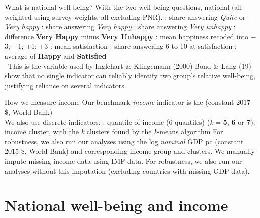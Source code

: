 \documentclass[aspectratio=169,xcolor=dvipsnames, 11pt,mathserif]{beamer}
\begin{document}
\begin{frame}{What is national well-being?}
    With the two well-being questions,  national  (all weighted using survey weights, all excluding PNR).
    \bbvsp
    \ip \textbf{}: share answering \textit{Quite} or \textit{Very happy}
    \ip \textbf{}: share answering \textit{Very happy}
    \ip \textbf{}: share answering \textit{Very unhappy}
    \ip \textbf{}: difference \textbf{Very Happy} minus \textbf{Very Unhappy}
    \ip \textbf{}: mean happiness recoded into $-$3; $-$1; +1; +3
    \ip \textbf{}: mean satisfaction
    \ip \textbf{}: share answering 6 to 10 at satisfaction
    \ip \textbf{}: average of \textbf{Happy} and \textbf{Satisfied}\\ ~\quad This is the variable used by Inglehart \& Klingemann (2000) %
    \ip Bond \& Lang (19) show that no single indicator can reliably identify two group's relative well-being, justifying reliance on several indicators.
    \ee 
\end{frame}

\begin{frame}{How we measure income}    
    \bbvsp %
    \ip Our benchmark \textit{income} indicator is the  (constant 2017 \$, World Bank) \pause \\ We also use discrete indicators: \pause \bbvsp
    \ip \textbf{}: quantile of income (6 quantiles)
    \ip \textbf{} (\textit{k} = \textbf{5}, \textbf{6} or \textbf{7}): income cluster, with the \textit{k} clusters found by the \textit{k}-means algorithm
    \ee
    \ip For robustness, we also run our analyses using the log \textit{nominal} GDP pc (constant 2015 \$, World Bank) and corresponding income group and clusters.
    \ip We manually impute missing income data using IMF data.
    \bbvsp \ip For robustness, we also run our analyses without this imputation (excluding countries with missing GDP data).
    \ee
    \ee 
\end{frame}

\section{National well-being and income}
\end{document}

